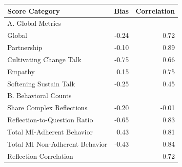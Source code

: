 \begin{tabular}{p{10cm}rr}
\toprule
Score Category & Bias & Correlation \\
\midrule
A. Global Metrics &  &  \\
Global & -0.24 & 0.72 \\
Partnership & -0.10 & 0.89 \\
Cultivating Change Talk & -0.75 & 0.66 \\
Empathy & 0.15 & 0.75 \\
Softening Sustain Talk & -0.25 & 0.45 \\
B. Behavioral Counts &  &  \\
Share Complex Reflections & -0.20 & -0.01 \\
Reflection-to-Question Ratio & -0.65 & 0.83 \\
Total MI-Adherent Behavior & 0.43 & 0.81 \\
Total MI Non-Adherent Behavior & -0.43 & 0.84 \\
Reflection Correlation &  & 0.72 \\
\bottomrule
\end{tabular}